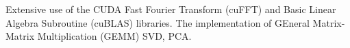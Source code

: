 Extensive use of the CUDA Fast Fourier Transform (cuFFT) and Basic Linear Algebra Subroutine (cuBLAS) libraries. The implementation of GEneral Matrix-Matrix Multiplication (GEMM) SVD, PCA.